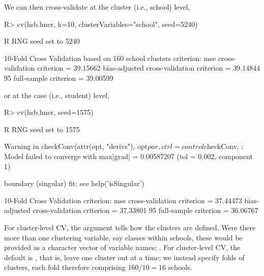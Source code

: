 \documentclass[
]{jss}
\begin{document}
We can then cross-validate at the cluster (i.e., school) level,

\begin{CodeChunk}
\begin{CodeInput}
R> cv(hsb.lmer, k=10, clusterVariables="school", seed=5240)
\end{CodeInput}
\begin{CodeOutput}
R RNG seed set to 5240
\end{CodeOutput}
\begin{CodeOutput}
10-Fold Cross Validation based on 160 {school} clusters
criterion: mse
cross-validation criterion = 39.15662
bias-adjusted cross-validation criterion = 39.14844
95%
full-sample criterion = 39.00599 
\end{CodeOutput}
\end{CodeChunk}

or at the case (i.e., student) level,

\begin{CodeChunk}
\begin{CodeInput}
R> cv(hsb.lmer, seed=1575)
\end{CodeInput}
\begin{CodeOutput}
R RNG seed set to 1575
\end{CodeOutput}
\begin{CodeOutput}
Warning in checkConv(attr(opt, "derivs"), opt$par, ctrl = control$checkConv, :
Model failed to converge with max|grad| = 0.00587207 (tol = 0.002, component 1)
\end{CodeOutput}
\begin{CodeOutput}
boundary (singular) fit: see help('isSingular')
\end{CodeOutput}
\begin{CodeOutput}
10-Fold Cross Validation
criterion: mse
cross-validation criterion = 37.44473
bias-adjusted cross-validation criterion = 37.33801
95%
full-sample criterion = 36.06767 
\end{CodeOutput}
\end{CodeChunk}

For cluster-level CV, the  argument tells
 how the clusters are defined. Were there more than one
clustering variable, say classes within schools, these would be provided
as a character vector of variable names:
. For cluster-level CV,
the default is , that is, leave one cluster out at a
time; we instead specify  folds of clusters, each fold
therefore comprising \(160/10 = 16\) schools.
\end{document}
